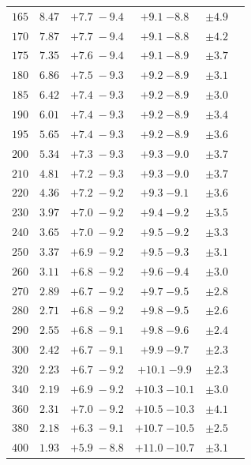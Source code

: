 \begin{table}[!h]
\begin{center}
\begin{tabular}{cccccc}
$165$ & $8.47$  & ${ +7.7 \; -9.4 }$ & ${+9.1}\;{ -8.8}$ & ${\pm 4.9} $  \\  
$170$ & $7.87$  & ${ +7.7 \; -9.4 }$ & ${+9.1}\;{ -8.8}$ & ${\pm 4.2} $  \\  
$175$ & $7.35$  & ${ +7.6 \; -9.4 }$ & ${+9.1}\;{ -8.9}$ & ${\pm 3.7} $  \\  
$180$ & $6.86$  & ${ +7.5 \; -9.3 }$ & ${+9.2}\;{ -8.9}$ & ${\pm 3.1} $  \\  
$185$ & $6.42$  & ${ +7.4 \; -9.3 }$ & ${+9.2}\;{ -8.9}$ & ${\pm 3.0} $  \\  
$190$ & $6.01$  & ${ +7.4 \; -9.3 }$ & ${+9.2}\;{ -8.9}$ & ${\pm 3.4} $  \\  
$195$ & $5.65$  & ${ +7.4 \; -9.3 }$ & ${+9.2}\;{ -8.9}$ & ${\pm 3.6} $  \\  
$200$ & $5.34$  & ${ +7.3 \; -9.3 }$ & ${+9.3}\;{ -9.0}$ & ${\pm 3.7} $  \\  
$210$ & $4.81$  & ${ +7.2 \; -9.3 }$ & ${+9.3}\;{ -9.0}$ & ${\pm 3.7} $  \\  
$220$ & $4.36$  & ${ +7.2 \; -9.2 }$ & ${+9.3}\;{ -9.1}$ & ${\pm 3.6} $  \\  
$230$ & $3.97$  & ${ +7.0 \; -9.2 }$ & ${+9.4}\;{ -9.2}$ & ${\pm 3.5} $  \\  
$240$ & $3.65$  & ${ +7.0 \; -9.2 }$ & ${+9.5}\;{ -9.2}$ & ${\pm 3.3} $  \\  
$250$ & $3.37$  & ${ +6.9 \; -9.2 }$ & ${+9.5}\;{ -9.3}$ & ${\pm 3.1} $  \\  
$260$ & $3.11$  & ${ +6.8 \; -9.2 }$ & ${+9.6}\;{ -9.4}$ & ${\pm 3.0} $  \\  
$270$ & $2.89$  & ${ +6.7 \; -9.2 }$ & ${+9.7}\;{ -9.5}$ & ${\pm 2.8} $  \\  
$280$ & $2.71$  & ${ +6.8 \; -9.2 }$ & ${+9.8}\;{ -9.5}$ & ${\pm 2.6} $  \\  
$290$ & $2.55$  & ${ +6.8 \; -9.1 }$ & ${+9.8}\;{ -9.6}$ & ${\pm 2.4} $  \\  
$300$ & $2.42$  & ${ +6.7 \; -9.1 }$ & ${+9.9}\;{ -9.7}$ & ${\pm 2.3} $  \\  
$320$ & $2.23$  & ${ +6.7 \; -9.2 }$ & ${+10.1}\;{-9.9}$ & ${\pm 2.3} $  \\  
$340$ & $2.19$  & ${ +6.9 \; -9.2 }$ & ${+10.3}\;{-10.1}$& ${\pm 3.0} $ \\  
$360$ & $2.31$  & ${ +7.0 \; -9.2 }$ & ${+10.5}\;{-10.3}$& ${\pm 4.1} $ \\  
$380$ & $2.18$  & ${ +6.3 \; -9.1 }$ & ${+10.7}\;{-10.5}$& ${\pm 2.5} $  \\  
$400$ & $1.93$  & ${ +5.9 \; -8.8 }$ & ${+11.0}\;{-10.7}$& ${\pm 3.1} $  \\  

\end{tabular}
\end{center}
\end{table}
